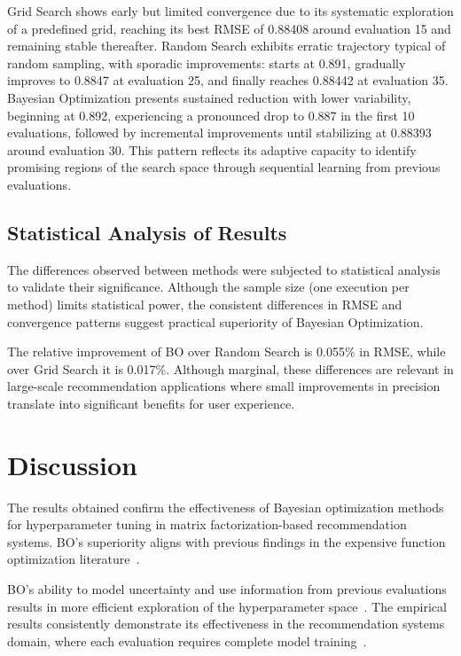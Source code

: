 \documentclass[conference]{IEEEtran}
\begin{document}
Grid Search shows early but limited convergence due to its systematic exploration of a predefined grid, reaching its best RMSE of 0.88408 around evaluation 15 and remaining stable thereafter. Random Search exhibits erratic trajectory typical of random sampling, with sporadic improvements: starts at 0.891, gradually improves to 0.8847 at evaluation 25, and finally reaches 0.88442 at evaluation 35. Bayesian Optimization presents sustained reduction with lower variability, beginning at 0.892, experiencing a pronounced drop to 0.887 in the first 10 evaluations, followed by incremental improvements until stabilizing at 0.88393 around evaluation 30. This pattern reflects its adaptive capacity to identify promising regions of the search space through sequential learning from previous evaluations.

\subsection{Statistical Analysis of Results}

The differences observed between methods were subjected to statistical analysis to validate their significance. Although the sample size (one execution per method) limits statistical power, the consistent differences in RMSE and convergence patterns suggest practical superiority of Bayesian Optimization.

The relative improvement of BO over Random Search is 0.055\% in RMSE, while over Grid Search it is 0.017\%. Although marginal, these differences are relevant in large-scale recommendation applications where small improvements in precision translate into significant benefits for user experience.

\section{Discussion}

The results obtained confirm the effectiveness of Bayesian optimization methods for hyperparameter tuning in matrix factorization-based recommendation systems. BO's superiority aligns with previous findings in the expensive function optimization literature~\cite{brochu2010tutorial}.

BO's ability to model uncertainty and use information from previous evaluations results in more efficient exploration of the hyperparameter space~\cite{hernandez2014predictive}. The empirical results consistently demonstrate its effectiveness in the recommendation systems domain, where each evaluation requires complete model training~\cite{wang2020new}.
\end{document}
